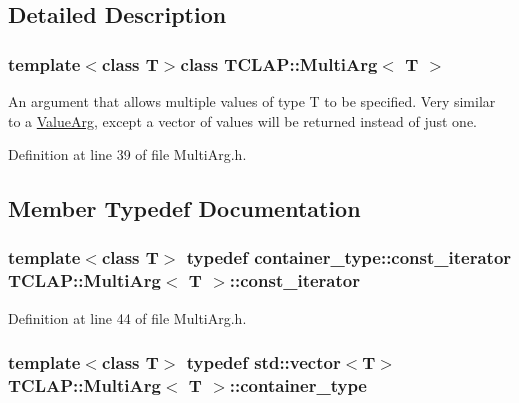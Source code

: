 \subsection{Detailed Description}
\subsubsection*{template$<$class T$>$class T\+C\+L\+A\+P\+::\+Multi\+Arg$<$ T $>$}

An argument that allows multiple values of type T to be specified. Very similar to a \hyperlink{class_t_c_l_a_p_1_1_value_arg}{Value\+Arg}, except a vector of values will be returned instead of just one. 

Definition at line 39 of file Multi\+Arg.\+h.



\subsection{Member Typedef Documentation}
\hypertarget{class_t_c_l_a_p_1_1_multi_arg_a3f8e9e8f5dcc7d3e6a518f42134cf64f}{}
\subsubsection[{const\+\_\+iterator}]{\setlength{\rightskip}{0pt plus 5cm}template$<$class T$>$ typedef container\+\_\+type\+::const\+\_\+iterator {\bf T\+C\+L\+A\+P\+::\+Multi\+Arg}$<$ T $>$\+::{\bf const\+\_\+iterator}}\label{class_t_c_l_a_p_1_1_multi_arg_a3f8e9e8f5dcc7d3e6a518f42134cf64f}


Definition at line 44 of file Multi\+Arg.\+h.

\hypertarget{class_t_c_l_a_p_1_1_multi_arg_adae435f03fdde769bca57327487aab78}{}
\subsubsection[{container\+\_\+type}]{\setlength{\rightskip}{0pt plus 5cm}template$<$class T$>$ typedef std\+::vector$<$T$>$ {\bf T\+C\+L\+A\+P\+::\+Multi\+Arg}$<$ T $>$\+::{\bf container\+\_\+type}}\label{class_t_c_l_a_p_1_1_multi_arg_adae435f03fdde769bca57327487aab78}


